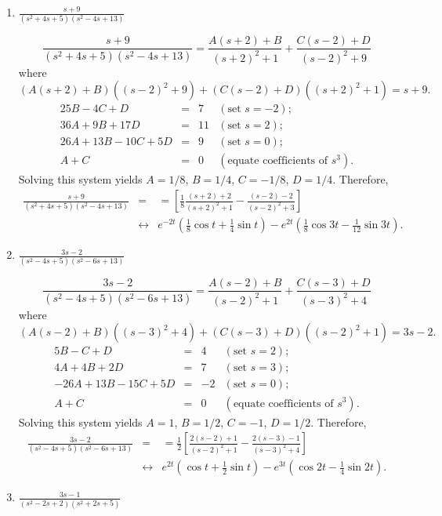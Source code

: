 \documentclass{ximera}
\begin{document}
\begin{problem}
\begin{enumerate}
    \item $\frac{s+9}{(s^2+4s+5)(s^2-4s+13)}$

\begin{solution}
$$\frac{s+9}{(s^2+4s+5)(s^2-4s+13)}
=\frac{A(s+2)+B}{(s+2)^2+1}+\frac{C(s-2)+D}{(s-2)^2+9}
$$
where
$$
(A(s+2)+B)((s-2)^2+9)+(C(s-2)+D)((s+2)^2+1)=s+9.
$$
$$
\begin{array}{rcrl}
25B-4C+D&=&7&(\mbox{set }s=-2);\\
36A+9B+17D&=&11& (\mbox{set }s=2);\\
26A+13B-10C+5D&=&9&(\mbox{set }s=0);\\
A+C&=&0&(\mbox{equate coefficients of }s^3).
\end{array}
$$
Solving this system yields $A=1/8$, $B=1/4$,
$C=-1/8$, $D=1/4$. Therefore,
\begin{eqnarray*}
\frac{s+9}{(s^2+4s+5)(s^2-4s+13)}
&=&
=\left[\frac{1}{8}\frac{(s+2)+2}{(s+2)^2+1}-\frac{(s-2)-2}{(s-2)^2+3}\right]
\\&\leftrightarrow&
{e^{-2t}\left(\frac{1}{8}\cos t+\frac{1}{4}\sin t\right)-e^{2t}\left(\frac{1}{8}\cos 3t-\frac{1}{12}\sin
3t\right)}.
\end{eqnarray*}
\end{solution}
    
    \item $\frac{3s-2}{(s^2-4s+5)(s^2-6s+13)}$

\begin{solution}
$$\frac{3s-2}{(s^2-4s+5)(s^2-6s+13)}
=\frac{A(s-2)+B}{(s-2)^2+1}+\frac{C(s-3)+D}{(s-3)^2+4}
$$
where
$$
(A(s-2)+B)((s-3)^2+4)+(C(s-3)+D)((s-2)^2+1)=3s-2.
$$
$$
\begin{array}{rcrl}
5B-C+D&=&4&(\mbox{set }s=2);\\
4A+4B+2D&=&7& (\mbox{set }s=3);\\
-26A+13B-15C+5D&=&-2&(\mbox{set }s=0);\\
A+C&=&0&(\mbox{equate coefficients of }s^3).
\end{array}
$$
Solving this system yields $A=1$, $B=1/2$,
$C=-1$, $D=1/2$. Therefore,
\begin{eqnarray*}
\frac{3s-2}{(s^2-4s+5)(s^2-6s+13)}
&=&
=\frac{1}{2}\left[\frac{2(s-2)+1}{(s-2)^2+1}-\frac{2(s-3)-1}{(s-3)^2+4}\right]
\\&\leftrightarrow&
e^{2t}\left(\cos t+\frac{1}{2}\sin
t\right)-e^{3t}\left(\cos 2t-\frac{1}{4}\sin 2t\right).
\end{eqnarray*}
\end{solution}
    
    \item $\frac{3s-1}{(s^2-2s+2)(s^2+2s+5)}$


\end{enumerate}
\end{problem}
\end{document}

